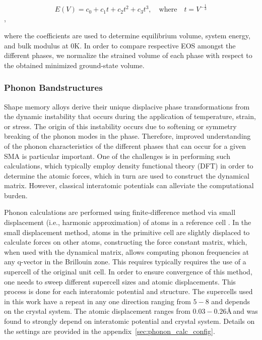 \documentclass[preprint,colorlinks=true,linkcolor=black,citecolor=black]{elsarticle}
\begin{document}
\begin{equation}
  \label{eq:eos_fit}
  E(V) = c_0 + c_1 t + c_2 t^2 + c_3 t^3, \quad \text{where} \quad t = V^{-\frac{1}{3}}
\end{equation},

where the coefficients are used to determine equilibrium volume, system energy, and bulk modulus \cite{Alchagirov2003} at 0K. In order to compare respective EOS amongst the different phases, we normalize the strained volume of each phase with respect to the obtained minimized ground-state volume. \par

\subsubsection{Phonon Bandstructures}

Shape memory alloys derive their unique displacive phase transformations from the dynamic instability that occurs during the application of temperature, strain, or stress. The origin of this instability occurs due to softening or symmetry breaking of the phonon modes in the phase. Therefore, improved understanding of the phonon characteristics of the different phases that can occur for a given SMA is particular important. One of the challenges is in performing such calculations, which typically employ density functional theory (DFT) in order to determine the atomic forces, which in turn are used to construct the dynamical matrix. However, classical interatomic potentials can alleviate the computational burden. \par

Phonon calculations are performed using finite-difference method via small displacement (i.e., harmonic approximation) of atoms in a reference cell \cite{Alfe2009}. In the small displacement method, atoms in the primitive cell are slightly displaced to calculate forces on other atoms, constructing the force constant matrix, which, when used with the dynamical matrix, allows computing phonon frequencies at any q-vector in the Brillouin zone. This requires typically requires the use of a supercell of the original unit cell. In order to ensure convergence of this method, one needs to sweep different supercell sizes and atomic displacements. This process is done for each interatomic potential and structure. The supercells used in this work  have a repeat in any one direction ranging from $5-8$ and depends on the crystal system. The atomic displacement ranges from $0.03-0.26$\AA\,and was found to strongly depend on interatomic potential and crystal system. Details on the settings are provided in the appendix~\ref{sec:phonon_calc_config}. \par
\end{document}
